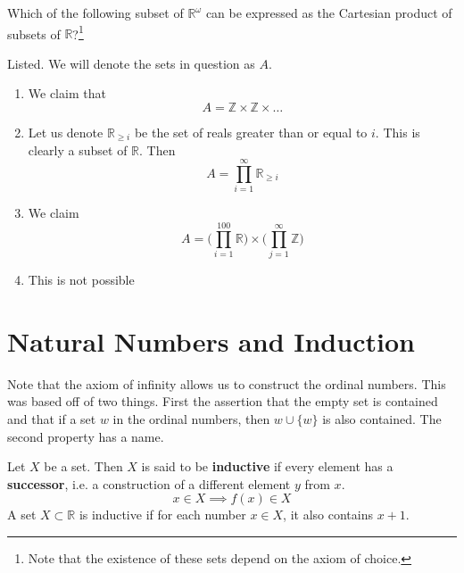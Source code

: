 \documentclass{article}
\begin{document}
    \begin{exercise} 
      Which of the following subset of $\mathbb{R}^\omega$ can be expressed as the Cartesian product of subsets of $\mathbb{R}$?\footnote{Note that the existence of these sets depend on the axiom of choice.}
    \end{exercise}
    \begin{solution}
      Listed. We will denote the sets in question as $A$. 
      \begin{enumerate}
        \item We claim that 
          \begin{equation}
            A = \mathbb{Z} \times \mathbb{Z} \times \ldots
          \end{equation}
        \item Let us denote $\mathbb{R}_{\geq i}$ be the set of reals greater than or equal to $i$. This is clearly a subset of $\mathbb{R}$. Then 
          \begin{equation}
            A = \prod_{i=1}^\infty \mathbb{R}_{\geq i}
          \end{equation}
        \item We claim 
          \begin{equation}
            A = \bigg( \prod_{i=1}^{100} \mathbb{R} \bigg) \times \bigg( \prod_{j=1}^\infty \mathbb{Z} \bigg)
          \end{equation}
        \item This is not possible
      \end{enumerate}
      
    \end{solution}

\section{Natural Numbers and Induction} 

    Note that the axiom of infinity allows us to construct the ordinal numbers. This was based off of two things. First the assertion that the empty set is contained and that if a set $w$ in the ordinal numbers, then $w \cup \{w\}$ is also contained. The second property has a name. 

    \begin{definition} 
      Let $X$ be a set. Then $X$ is said to be \textbf{inductive} if every element has a \textbf{successor}, i.e. a construction of a different element $y$ from $x$.  
      \begin{equation}
        x \in X \implies f(x) \in X
      \end{equation}
      A set 
      $X \subset \mathbb{R}$ is inductive if for each number $x \in X$, it also contains $x + 1$. 
    \end{definition} 
\end{document}
